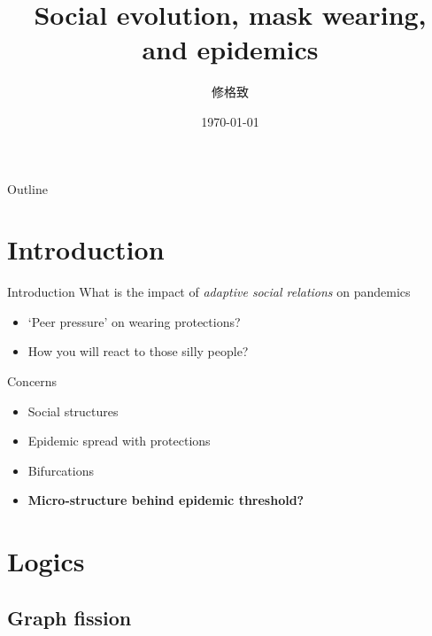 \documentclass{beamer}
\title[Social evolution, mask wearing, \& epidemics]{Social evolution, mask wearing, and epidemics}
\author{修格致}
\institute{IRSGIS, Peking Univ.}
\date{\today}
\begin{document}
\begin{frame}
  \titlepage
\end{frame}

\begin{frame}{Outline}
 \tableofcontents
\end{frame}

\section{Introduction}

\begin{frame}{Introduction}
\vspace{0.5cm}
    What is the impact of \textit{adaptive social relations} on pandemics

\begin{itemize}
  \item `Peer pressure' on wearing protections?
  \item How you will react to those silly people?
\end{itemize}
\vspace{1cm}

Concerns

\begin{itemize}
    \item Social structures
    \item Epidemic spread with protections
    \item Bifurcations
    \item \textbf{Micro-structure behind epidemic threshold?}
\end{itemize}

\end{frame}

\section{Logics}

\subsection{Graph fission}
\end{document}
